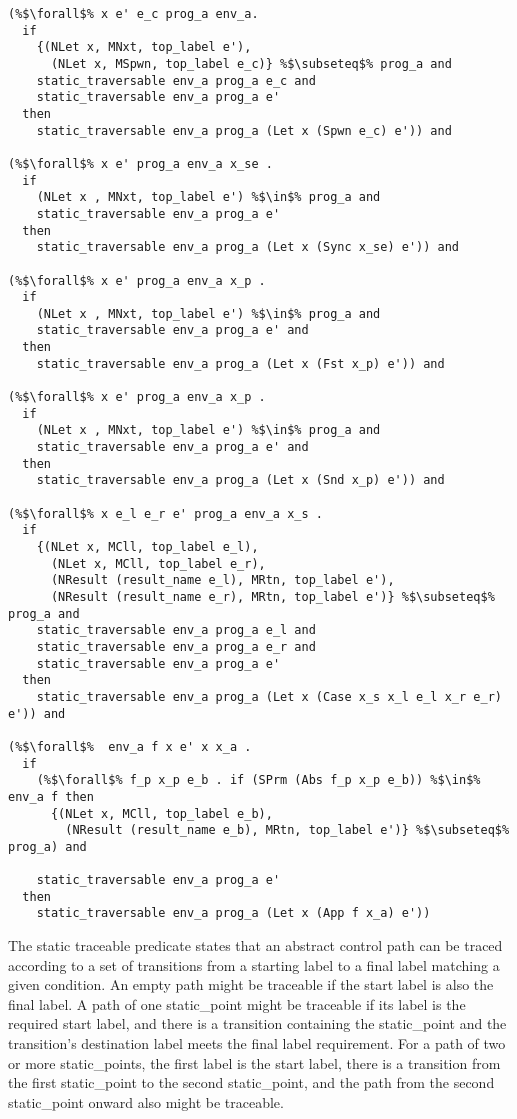 \documentclass{article}
\begin{document}
\begin{lstlisting}[language=logic, style=codestyle1, escapechar=\%]
(%$\forall$% x e' e_c prog_a env_a.
  if
    {(NLet x, MNxt, top_label e'),
      (NLet x, MSpwn, top_label e_c)} %$\subseteq$% prog_a and
    static_traversable env_a prog_a e_c and
    static_traversable env_a prog_a e'
  then
    static_traversable env_a prog_a (Let x (Spwn e_c) e')) and

(%$\forall$% x e' prog_a env_a x_se .
  if
    (NLet x , MNxt, top_label e') %$\in$% prog_a and
    static_traversable env_a prog_a e'
  then
    static_traversable env_a prog_a (Let x (Sync x_se) e')) and

(%$\forall$% x e' prog_a env_a x_p .
  if
    (NLet x , MNxt, top_label e') %$\in$% prog_a and
    static_traversable env_a prog_a e' and
  then
    static_traversable env_a prog_a (Let x (Fst x_p) e')) and

(%$\forall$% x e' prog_a env_a x_p .
  if
    (NLet x , MNxt, top_label e') %$\in$% prog_a and
    static_traversable env_a prog_a e' and
  then
    static_traversable env_a prog_a (Let x (Snd x_p) e')) and

(%$\forall$% x e_l e_r e' prog_a env_a x_s .
  if
    {(NLet x, MCll, top_label e_l),
      (NLet x, MCll, top_label e_r),
      (NResult (result_name e_l), MRtn, top_label e'),
      (NResult (result_name e_r), MRtn, top_label e')} %$\subseteq$% prog_a and
    static_traversable env_a prog_a e_l and
    static_traversable env_a prog_a e_r and
    static_traversable env_a prog_a e'
  then
    static_traversable env_a prog_a (Let x (Case x_s x_l e_l x_r e_r) e')) and
  
(%$\forall$%  env_a f x e' x x_a .
  if
    (%$\forall$% f_p x_p e_b . if (SPrm (Abs f_p x_p e_b)) %$\in$% env_a f then 
      {(NLet x, MCll, top_label e_b),
        (NResult (result_name e_b), MRtn, top_label e')} %$\subseteq$% prog_a) and

    static_traversable env_a prog_a e'
  then
    static_traversable env_a prog_a (Let x (App f x_a) e'))

\end{lstlisting}


The static traceable predicate states that an abstract control path can be traced according to
a set of transitions from a starting label to a final label matching a given condition.  An
empty path might be traceable if the start label is also the final label.  A path of one
static\_point
might be traceable if its label is the required start label, and there is a transition
containing the static\_point and the transition's destination label meets the final label requirement.
For a path of two or more static\_points, the first label is the start label, there is a transition from
the first static\_point to the second static\_point, and the path from the second static\_point onward also might be
traceable.
\end{document}
